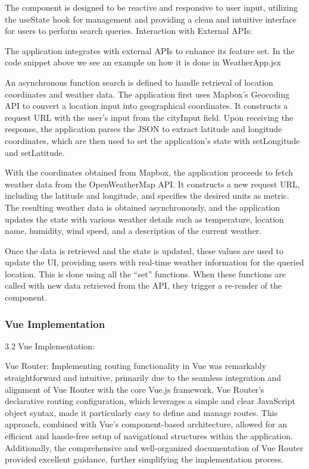 The component is designed to be reactive and responsive to user input, utilizing the useState hook for management and providing a clean and intuitive interface for users to perform search queries. 
Interaction with External APIs:


The application integrates with external APIs to enhance its feature set. In the code snippet above we see an example on how it is done in WeatherApp.jsx

An asynchronous function search is defined to handle retrieval of location coordinates and weather data. The application first uses Mapbox's Geocoding API to convert a location input into geographical coordinates. It constructs a request URL with the user's input from the cityInput field. Upon receiving the response, the application parses the JSON to extract latitude and longitude coordinates, which are then used to set the application's state with setLongitude and setLatitude.

With the coordinates obtained from Mapbox, the application proceeds to fetch weather data from the OpenWeatherMap API. It constructs a new request URL, including the latitude and longitude, and specifies the desired units as metric. The resulting weather data is obtained asynchronously, and the application updates the state with various weather details such as temperature, location name, humidity, wind speed, and a description of the current weather.

Once the data is retrieved and the state is updated, these values are used to update the UI, providing users with real-time weather information for the queried location. This is done using all the “set” functions. When these functions are called with new data retrieved from the API, they trigger a re-render of the component. 

\subsubsection*{Vue Implementation}
3.2 Vue Implementation: 



Vue Router:
Implementing routing functionality in Vue was remarkably straightforward and intuitive, primarily due to the seamless integration and alignment of Vue Router with the core Vue.js framework. Vue Router's declarative routing configuration, which leverages a simple and clear JavaScript object syntax, made it particularly easy to define and manage routes. This approach, combined with Vue's component-based architecture, allowed for an efficient and hassle-free setup of navigational structures within the application. Additionally, the comprehensive and well-organized documentation of Vue Router provided excellent guidance, further simplifying the implementation process.

